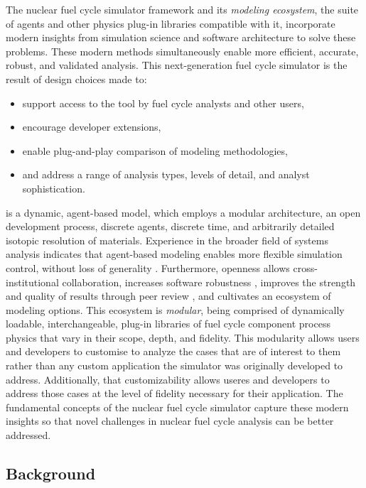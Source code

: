 The \Cyclus nuclear fuel cycle simulator framework and its \emph{modeling
ecosystem}, the suite of agents and other physics plug-in libraries compatible with it,
incorporate modern insights from simulation science and software architecture
to solve these problems.  These modern methods simultaneously enable more
efficient, accurate, robust, and validated analysis.  This next-generation fuel
cycle simulator is the result of design choices made to:

\begin{itemize}
\item support access to the tool by fuel cycle analysts and other users,
\item encourage developer extensions,
\item enable plug-and-play comparison of modeling methodologies,
\item and address a range of analysis types, levels of detail, and analyst sophistication.
\end{itemize}

\Cyclus is a dynamic, agent-based model, which employs a modular architecture,
an open development process, discrete agents, discrete time, and arbitrarily
detailed isotopic resolution of materials. Experience in the broader field of
systems analysis indicates that agent-based modeling enables more flexible
simulation control, without loss of generality
\cite{macal_agent-based_2010}. Furthermore, openness allows cross-institutional
collaboration, increases software robustness
\cite{cohen_modern_2010,fagan_design_2002}, improves
the strength and quality of results through peer review
\cite{donoho_reproducible_2009,ince_case_2012,stodden_scientific_2010,wicherts_willingness_2011,petre_code_2014}, and
cultivates an ecosystem of modeling options. This ecosystem is \emph{modular},
being comprised of dynamically loadable, interchangeable, plug-in libraries of fuel cycle component
process physics that vary in their scope, depth, and fidelity. This modularity
allows users and developers to customise \Cyclus to analyze the cases that are
of interest to them rather than any custom application the simulator was
originally developed to address. Additionally, that customizability allows
useres and developers to address those cases at the level of fidelity necessary
for their application. The fundamental concepts of the \Cyclus
nuclear fuel cycle simulator capture these modern insights so that novel
challenges in nuclear fuel cycle analysis can be better addressed.

\subsection{Background}

